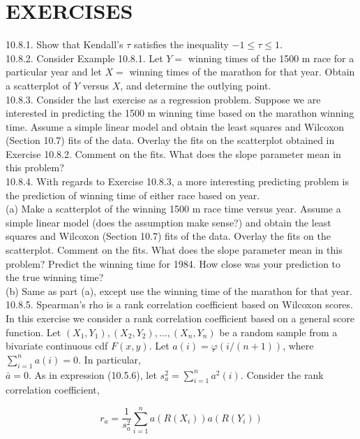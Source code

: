 \section*{EXERCISES}
10.8.1. Show that Kendall's $\tau$ satisfies the inequality $-1 \leq \tau \leq 1$.\\
10.8.2. Consider Example 10.8.1. Let $Y=$ winning times of the 1500 m race for a particular year and let $X=$ winning times of the marathon for that year. Obtain a scatterplot of $Y$ versus $X$, and determine the outlying point.\\
10.8.3. Consider the last exercise as a regression problem. Suppose we are interested in predicting the 1500 m winning time based on the marathon winning time. Assume a simple linear model and obtain the least squares and Wilcoxon (Section 10.7) fits of the data. Overlay the fits on the scatterplot obtained in Exercise 10.8.2. Comment on the fits. What does the slope parameter mean in this problem?\\
10.8.4. With regards to Exercise 10.8.3, a more interesting predicting problem is the prediction of winning time of either race based on year.\\
(a) Make a scatterplot of the winning 1500 m race time versus year. Assume a simple linear model (does the assumption make sense?) and obtain the least squares and Wilcoxon (Section 10.7) fits of the data. Overlay the fits on the scatterplot. Comment on the fits. What does the slope parameter mean in this problem? Predict the winning time for 1984. How close was your prediction to the true winning time?\\
(b) Same as part (a), except use the winning time of the marathon for that year.\\
10.8.5. Spearman's rho is a rank correlation coefficient based on Wilcoxon scores. In this exercise we consider a rank correlation coefficient based on a general score function. Let $\left(X_{1}, Y_{1}\right),\left(X_{2}, Y_{2}\right), \ldots,\left(X_{n}, Y_{n}\right)$ be a random sample from a bivariate continuous cdf $F(x, y)$. Let $a(i)=\varphi(i /(n+1))$, where $\sum_{i=1}^{n} a(i)=0$. In particular,\\
$\bar{a}=0$. As in expression (10.5.6), let $s_{a}^{2}=\sum_{i=1}^{n} a^{2}(i)$. Consider the rank correlation coefficient,


\begin{equation*}
r_{a}=\frac{1}{s_{a}^{2}} \sum_{i=1}^{n} a\left(R\left(X_{i}\right)\right) a\left(R\left(Y_{i}\right)\right) \tag{10.8.16}
\end{equation*}


